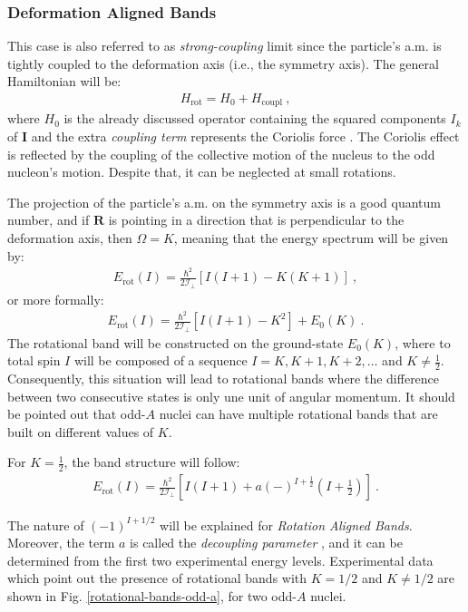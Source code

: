 \subsubsection*{Deformation Aligned Bands}

This case is also referred to as \emph{strong-coupling} limit \cite{bohr1953collective} since the particle's a.m. is tightly coupled to the deformation axis (i.e., the symmetry axis). The general Hamiltonian will be:
\begin{align}
    H_\text{rot}=H_0+H_\text{coupl}\ ,
\end{align}
where $H_0$ is the already discussed operator containing the squared components $I_k$ of $\mathbf{I}$ and the extra \emph{coupling term} represents the Coriolis force \cite{bertulani2007nuclear}. The Coriolis effect is reflected by the coupling of the collective motion of the nucleus to the odd nucleon's motion. Despite that, it can be neglected at small rotations.

The projection of the particle's a.m. on the symmetry axis is a good quantum number, and if $\mathbf{R}$ is pointing in a direction that is perpendicular to the deformation axis, then $\Omega=K$, meaning that the energy spectrum will be given by:
\begin{align}
    E_\text{rot}(I)=\frac{\hbar^2}{2\mathcal{I}_\perp}\left[I(I+1)-K(K+1)\right]\ ,
\end{align}
or more formally:
\begin{align}
    E_\text{rot}(I)=\frac{\hbar^2}{2\mathcal{I}_\perp}\left[I(I+1)-K^2\right]+E_0(K)\ .
\end{align}
The rotational band will be constructed on the ground-state $E_0(K)$, where to total spin $I$ will be composed of a sequence $I=K,K+1,K+2,\dots$ and $K\neq\frac{1}{2}$. Consequently, this situation will lead to rotational bands where the difference between two consecutive states is only une unit of angular momentum. It should be pointed out that odd-$A$ nuclei can have multiple rotational bands that are built on different values of $K$.

For $K=\frac{1}{2}$, the band structure will follow:
\begin{align}
    E_\text{rot}(I)=\frac{\hbar^2}{2\mathcal{I}_\perp}\left[I(I+1)+a(-)^{I+\frac{1}{2}}(I+\frac{1}{2})\right]\ .
    \label{deformation-aligned-energy}
\end{align}

The nature of $(-1)^{I+1/2}$ will be explained for \emph{Rotation Aligned Bands}. Moreover, the term $a$ is called the \emph{decoupling parameter} \cite{bertulani2007nuclear}, and it can be determined from the first two experimental energy levels.  Experimental data which point out the presence of rotational bands with $K=1/2$ and $K\neq 1/2$ are shown in Fig. \ref{rotational-bands-odd-a}, for two odd-$A$ nuclei.

